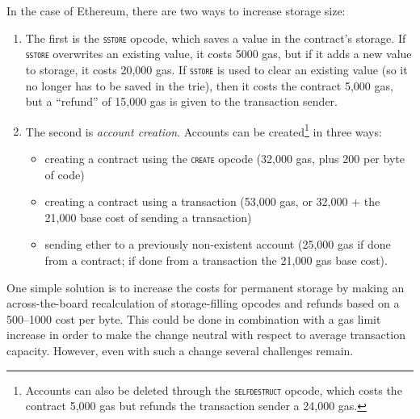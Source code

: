 \documentclass[12pt, final]{article}
\newcommand{\opcode}[1]{\textsc{\texttt{#1}}}
\begin{document}
In the case of Ethereum, there are two ways to increase storage size:

\begin{enumerate}
    \item The first is the \opcode{sstore} opcode, which saves a value in the contract's storage. If \opcode{sstore} overwrites an existing value, it costs 5000 gas, but if it adds a new value to storage, it costs 20,000 gas. If \opcode{sstore} is used to clear an existing value (so it no longer has to be saved in the trie), then it costs the contract 5,000 gas, but a ``refund'' of 15,000 gas is given to the transaction sender.

    \item The second is \emph{account creation}. Accounts can be created\footnote{Accounts can also be deleted through the \opcode{selfdestruct} opcode, which costs the contract 5,000 gas but refunds the transaction sender a 24,000 gas.} in three ways:

    \begin{itemize}
        \item creating a contract using the \opcode{create} opcode (32,000 gas, plus 200 per byte of code)
        \item creating a contract using a transaction (53,000 gas, or 32,000 + the 21,000 base cost of sending a transaction)
        \item sending ether to a previously non-existent account (25,000 gas if done from a contract; if done from a transaction the 21,000 gas base cost).

    \end{itemize}

\end{enumerate}


One simple solution is to increase the costs for permanent storage by making an across-the-board recalculation of storage-filling opcodes and refunds based on a 500--1000 cost per byte. This could be done in combination with a gas limit increase in order to make the change neutral with respect to average transaction capacity. However, even with such a change several challenges remain.
\end{document}
